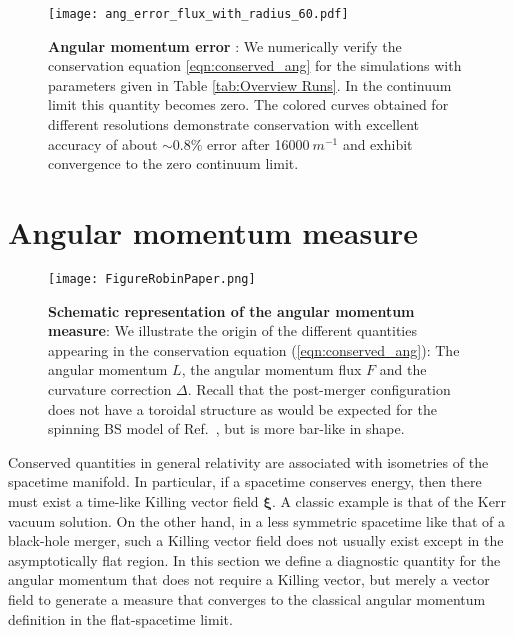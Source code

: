 \documentclass[11pt]{report}  %
\newcommand{\bs}{\boldsymbol}
\newcommand{\bs}{\boldsymbol}
\begin{document}
\begin{figure}[ht]
\begin{center}
{\texttt{[image: ang\_error\_flux\_with\_radius\_60.pdf]}}
    \caption{{\bf Angular momentum error }: We numerically
    verify the conservation equation
    \ref{eqn:conserved_ang} for the simulations with parameters 
    given in Table \ref{tab:Overview Runs}. In the continuum limit this
    quantity becomes zero. The colored curves
    obtained for different resolutions demonstrate
    conservation with excellent accuracy of
    about $\sim 0.8\%$ error after 16000$~m^{-1}$
    and exhibit convergence to the zero continuum limit.
    }
\label{fig:ViolCons}
\end{center}
\end{figure}


\section{Angular momentum measure}\label{sec:methods}

\begin{figure*}[t]
\begin{center}
    {\texttt{[image: FigureRobinPaper.png]}}
\caption{{\bf Schematic representation of the angular momentum measure}: We illustrate the origin of the different quantities 
appearing in the conservation equation
(\ref{eqn:conserved_ang}): The angular momentum
    ${L}$, the {angular momentum flux} $F$ and the
    curvature correction ${\Delta}$. Recall that the post-merger
    configuration does not have a toroidal structure
    as would be expected for the spinning BS model of
    Ref.~\cite{PhysRevD.90.024068,Yoshida:1997qf}, but is more bar-like in shape.
    }
\label{fig:AngMomTrick}
\end{center}
\end{figure*}

Conserved quantities in general relativity are associated with isometries of the spacetime manifold. In particular, if a spacetime conserves energy, then there must exist a time-like Killing vector field $\bs{\xi}$. A classic example is that of the Kerr vacuum solution. On the other hand, in a less symmetric spacetime like that of a black-hole merger, such a Killing vector field does not usually exist except in the asymptotically flat region. In this section we define a diagnostic quantity for the angular momentum that does not require a Killing vector, but merely a vector field to generate a measure that
converges to the classical angular momentum definition
in the flat-spacetime limit.
\end{document}
